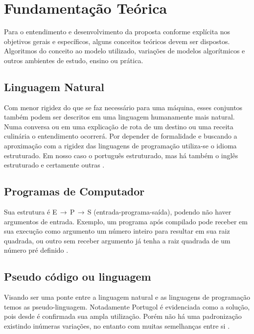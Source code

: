 \ifdraft{\color{green}}{}\chapter{Fundamentação Teórica}

Para o entendimento e desenvolvimento da proposta conforme explícita nos objetivos gerais e específicos, alguns conceitos teóricos devem ser dispostos. Algoritmos do conceito ao modelo utilizado, variações de modelos algorítmicos e outros ambientes de estudo, ensino ou prática.

\section{Linguagem Natural}

Com menor rigidez do que se faz necessário para uma máquina, esses conjuntos também podem ser descritos em uma linguagem humanamente mais natural. Numa conversa ou em uma explicação de rota de um destino ou uma receita culinária o entendimento ocorrerá. Por depender de formalidade e buscando a aproximação com a rigidez das linguagens de programação utiliza-se o idioma estruturado. Em nosso caso o português estruturado, mas há também o inglês estruturado e certamente outras .

\section{Programas de Computador}

Sua estrutura é E$\,\to\,$P$\,\to\,$S (entrada-programa-saída), podendo não haver argumentos de entrada. Exemplo, um programa após compilado pode receber em sua execução como argumento um número inteiro para resultar em sua raiz quadrada, ou outro sem receber argumento já tenha a raiz quadrada de um número pré definido .

\section{Pseudo código ou linguagem}

Visando ser uma ponte entre a linguagem natural e as linguagens de programação temos as pseudo-linguagem. Notadamente Portugol é evidenciada como a solução, pois desde  é confirmada sua ampla utilização. Porém não há uma padronização existindo inúmeras variações, no entanto com muitas semelhanças entre si .

